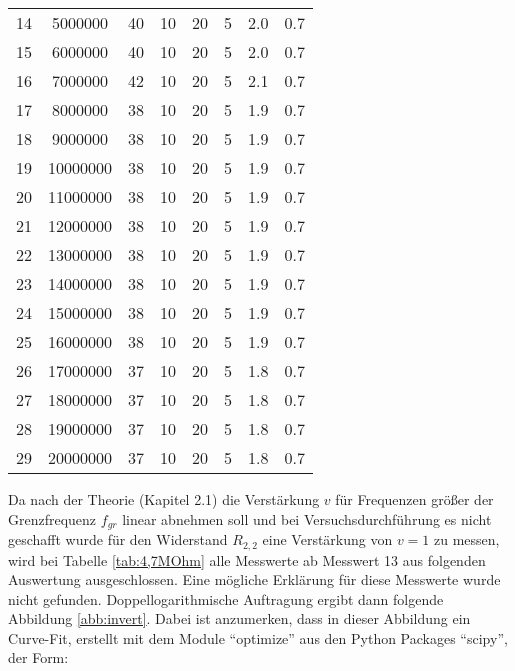 \begin{center}
\begin{tabular}{l | c c c c c | c c}
        14 &   5000000 &    40 &        10 &    20 &         5 &    2.0 &    0.7 \\  
        15 &   6000000 &    40 &        10 &    20 &         5 &    2.0 &    0.7 \\  
        16 &   7000000 &    42 &        10 &    20 &         5 &    2.1 &    0.7 \\  
        17 &   8000000 &    38 &        10 &    20 &         5 &    1.9 &    0.7 \\  
        18 &   9000000 &    38 &        10 &    20 &         5 &    1.9 &    0.7 \\  
        19 &  10000000 &    38 &        10 &    20 &         5 &    1.9 &    0.7 \\  
        20 &  11000000 &    38 &        10 &    20 &         5 &    1.9 &    0.7 \\  
        21 &  12000000 &    38 &        10 &    20 &         5 &    1.9 &    0.7 \\  
        22 &  13000000 &    38 &        10 &    20 &         5 &    1.9 &    0.7 \\  
        23 &  14000000 &    38 &        10 &    20 &         5 &    1.9 &    0.7 \\  
        24 &  15000000 &    38 &        10 &    20 &         5 &    1.9 &    0.7 \\  
        25 &  16000000 &    38 &        10 &    20 &         5 &    1.9 &    0.7 \\  
        26 &  17000000 &    37 &        10 &    20 &         5 &    1.8 &    0.7 \\  
        27 &  18000000 &    37 &        10 &    20 &         5 &    1.8 &    0.7 \\  
        28 &  19000000 &    37 &        10 &    20 &         5 &    1.8 &    0.7 \\  
        29 &  20000000 &    37 &        10 &    20 &         5 &    1.8 &    0.7 \\  
    \end{tabular}
    \label{tab:4,7MOhm}
\end{center}
Da nach der Theorie (Kapitel 2.1) die Verstärkung $v$ für Frequenzen größer der Grenzfrequenz $f_{gr}$ linear abnehmen soll und bei Versuchsdurchführung es nicht geschafft wurde für den Widerstand $R_{2,2}$ eine Verstärkung von $v=1$ zu messen, wird bei Tabelle \ref{tab:4,7MOhm} alle Messwerte ab Messwert 13 aus folgenden Auswertung ausgeschlossen. Eine mögliche Erklärung für diese Messwerte wurde nicht gefunden.
\newpage
Doppellogarithmische Auftragung ergibt dann folgende Abbildung \ref{abb:invert}. Dabei ist anzumerken, dass in dieser Abbildung ein Curve-Fit, erstellt mit dem Module \enquote{optimize} aus den Python Packages \enquote{scipy}, der Form:
